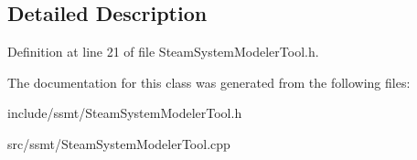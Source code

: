 \subsection{Detailed Description}


Definition at line 21 of file Steam\+System\+Modeler\+Tool.\+h.



The documentation for this class was generated from the following files\+:\begin{DoxyCompactItemize}
\item 
include/ssmt/Steam\+System\+Modeler\+Tool.\+h\item 
src/ssmt/Steam\+System\+Modeler\+Tool.\+cpp\end{DoxyCompactItemize}
